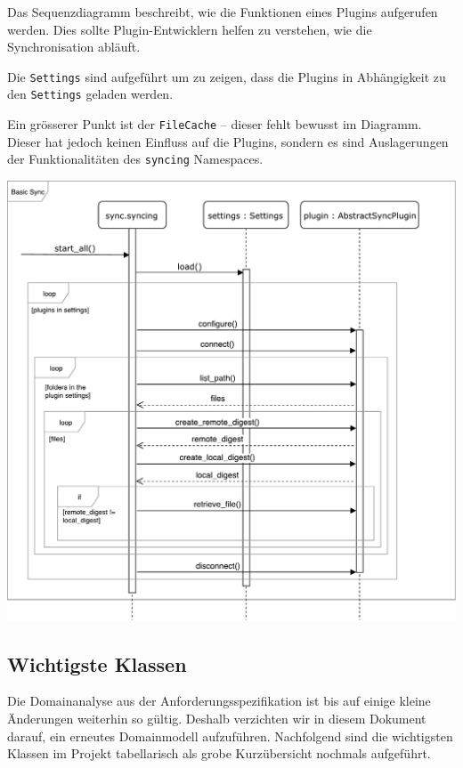 \documentclass[a4paper]{article}
\begin{document}
Das Sequenzdiagramm beschreibt, wie die Funktionen eines Plugins aufgerufen werden.
Dies sollte Plugin-Entwicklern helfen zu verstehen, wie die Synchronisation abläuft.

Die \verb|Settings| sind aufgeführt um zu zeigen, dass die Plugins in Abhängigkeit zu den \verb|Settings| geladen werden.

Ein grösserer Punkt ist der \verb|FileCache| -- dieser fehlt bewusst im Diagramm.
Dieser hat jedoch keinen Einfluss auf die Plugins, sondern es sind Auslagerungen der Funktionalitäten des \verb|syncing| Namespaces.

\includegraphics[width=40em]{./img/GrobesSequenzDiagramm.pdf}

\pagebreak
\subsection{Wichtigste Klassen}

Die Domainanalyse aus der Anforderungsspezifikation ist bis auf einige kleine
Änderungen weiterhin so gültig. Deshalb verzichten wir in diesem Dokument
darauf, ein erneutes Domainmodell aufzuführen. Nachfolgend sind die wichtigsten
Klassen im Projekt tabellarisch als grobe Kurzübersicht nochmals aufgeführt.
\end{document}
